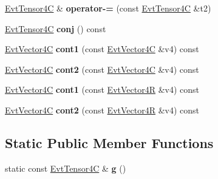 \begin{DoxyCompactItemize}
\item 
\hypertarget{class_evt_tensor4_c_a56f0d05f290d760add061cfc5e360be0}{}\hyperlink{class_evt_tensor4_c}{Evt\+Tensor4\+C} \& {\bfseries operator-\/=} (const \hyperlink{class_evt_tensor4_c}{Evt\+Tensor4\+C} \&t2)\label{class_evt_tensor4_c_a56f0d05f290d760add061cfc5e360be0}

\item 
\hypertarget{class_evt_tensor4_c_a6d6d2505bb82082d12c8780749994808}{}\hyperlink{class_evt_tensor4_c}{Evt\+Tensor4\+C} {\bfseries conj} () const \label{class_evt_tensor4_c_a6d6d2505bb82082d12c8780749994808}

\item 
\hypertarget{class_evt_tensor4_c_a8b8b1e6b218089593af645cc933d2d08}{}\hyperlink{class_evt_vector4_c}{Evt\+Vector4\+C} {\bfseries cont1} (const \hyperlink{class_evt_vector4_c}{Evt\+Vector4\+C} \&v4) const \label{class_evt_tensor4_c_a8b8b1e6b218089593af645cc933d2d08}

\item 
\hypertarget{class_evt_tensor4_c_a09f446c4c65205218edd3d0e3cd5c52d}{}\hyperlink{class_evt_vector4_c}{Evt\+Vector4\+C} {\bfseries cont2} (const \hyperlink{class_evt_vector4_c}{Evt\+Vector4\+C} \&v4) const \label{class_evt_tensor4_c_a09f446c4c65205218edd3d0e3cd5c52d}

\item 
\hypertarget{class_evt_tensor4_c_a9dda4d346cdc2bbccf32e085febbb91a}{}\hyperlink{class_evt_vector4_c}{Evt\+Vector4\+C} {\bfseries cont1} (const \hyperlink{class_evt_vector4_r}{Evt\+Vector4\+R} \&v4) const \label{class_evt_tensor4_c_a9dda4d346cdc2bbccf32e085febbb91a}

\item 
\hypertarget{class_evt_tensor4_c_a219605b791e8dec2767a502c4b0ec79a}{}\hyperlink{class_evt_vector4_c}{Evt\+Vector4\+C} {\bfseries cont2} (const \hyperlink{class_evt_vector4_r}{Evt\+Vector4\+R} \&v4) const \label{class_evt_tensor4_c_a219605b791e8dec2767a502c4b0ec79a}

\end{DoxyCompactItemize}
\subsection*{Static Public Member Functions}
\begin{DoxyCompactItemize}
\item 
\hypertarget{class_evt_tensor4_c_a691af3f078e63f4f4e020d98ab5645f4}{}static const \hyperlink{class_evt_tensor4_c}{Evt\+Tensor4\+C} \& {\bfseries g} ()\label{class_evt_tensor4_c_a691af3f078e63f4f4e020d98ab5645f4}

\end{DoxyCompactItemize}
